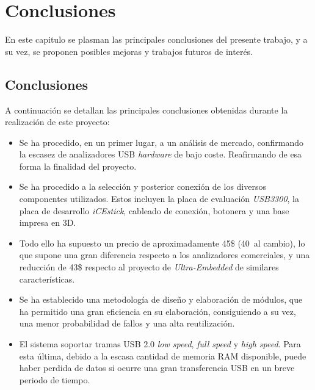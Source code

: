 \chapter{Conclusiones}
\label{ch:conclusiones}

En este capitulo se plasman las principales conclusiones del presente trabajo, y a su vez, se proponen posibles mejoras y trabajos futuros de interés.

\section{Conclusiones}
A continuación se detallan las principales conclusiones obtenidas durante la realización de este proyecto:

\begin{itemize}
    \item Se ha procedido, en un primer lugar, a un análisis de mercado, confirmando la escasez de analizadores USB \emph{hardware} de bajo coste. Reafirmando de esa forma la finalidad del proyecto.
    
    \item Se ha procedido a la selección y posterior conexión de los diversos componentes utilizados. Estos incluyen la placa de evaluación \emph{USB3300}, la placa de desarrollo \emph{iCEstick}, cableado de conexión, botonera y una base impresa en 3D.
    
    \item Todo ello ha supuesto un precio de aproximadamente 45\$ (40\texteuro~al cambio), lo que supone una gran diferencia respecto a los analizadores comerciales, y una reducción de 43\$ respecto al proyecto de \emph{Ultra-Embedded} de similares características.
    
    \item Se ha establecido una metodología de diseño y elaboración de módulos, que ha permitido una gran eficiencia en su elaboración, consiguiendo a su vez, una menor probabilidad de fallos y una alta reutilización.
    
    \item El sistema soportar tramas USB 2.0 \emph{low speed}, \emph{full speed} y \emph{high speed}. Para esta última, debido a la escasa cantidad de memoria RAM disponible, puede haber perdida de datos si ocurre una gran transferencia USB en un breve periodo de tiempo.


\end{itemize}
